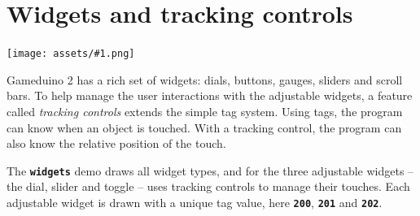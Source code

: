 \documentclass[10pt]{book}
\newcommand{\gdtwo}{Gameduino 2 }
\newcommand{\png}[1]{
\begin{center}
\texttt{[image: assets/\#1.png]}
\end{center}
}
\newcommand{\mach}[1]{\texttt{\textbf{#1}}}
\begin{document}
\section{Widgets and tracking controls}
\label{widgets}

\png{widgets3d}

\gdtwo has a rich set of widgets: dials, buttons, gauges, sliders and scroll bars.
To help manage the user interactions with the adjustable widgets, a feature called \textit{tracking controls}
extends the simple tag system.
Using tags, the program can know when an object is touched.
With a tracking control, the program can also know the relative position of the touch.

The \mach{widgets} demo draws all widget types, and
for the three adjustable widgets -- the dial, slider and toggle -- uses tracking controls to manage their touches.
Each adjustable widget is drawn with a unique tag value, here
\mach{200},
\mach{201} and
\mach{202}.

\vspace{10pt}

\end{document}
